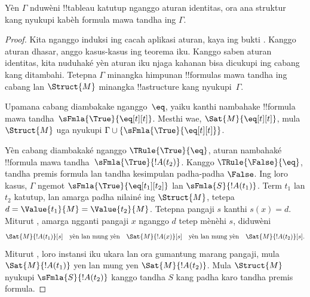 \documentclass[../../../include/open-logic-section]{subfiles}
\begin{document}


\begin{prop}
Yèn $\Gamma$ nduwèni !!{tableau} katutup nganggo aturan identitas,
ora ana struktur kang nyukupi kabèh formula mawa tandha ing $\Gamma$.
\end{prop}

\begin{proof}
Kita nganggo induksi ing cacah aplikasi aturan, kaya ing bukti
. Kanggo aturan dhasar, anggo kasus-kasus ing
teorema iku. Kanggo saben aturan identitas, kita nuduhaké yèn aturan
iku njaga kahanan bisa dicukupi ing cabang kang ditambahi.
Tetepna $\Gamma$ minangka himpunan !!{formula}s mawa tandha ing
cabang lan $\Struct{M}$ minangka !!a{structure} kang nyukupi~$\Gamma$.

Upamana cabang diambakake nganggo~$\eq$, yaiku kanthi nambahake
!!{formula} mawa tandha~$\sFmla{\True}{\eq[t][t]}$. Mesthi wae,
$\Sat{M}{\eq[t][t]}$, mula $\Struct{M}$ uga nyukupi $\Gamma \cup
\{\sFmla{\True}{\eq[t][t]}\}$.

Yèn cabang diambakaké nganggo $\TRule{\True}{\eq}$, aturan nambahaké
!!{formula} mawa tandha~$\sFmla{\True}{!A(t_2)}$. Kanggo
$\TRule{\False}{\eq}$, tandha premis formula lan tandha kesimpulan
padha-padha $\False$. Ing loro kasus, $\Gamma$ ngemot
$\sFmla{\True}{\eq[t_1][t_2]}$ lan $\sFmla{S}{!A(t_1)}$.
Term $t_1$ lan $t_2$ katutup, lan amarga padha nilainé ing
$\Struct{M}$, tetepa $d=\Value{t_1}{M}=\Value{t_2}{M}$.
Tetepna pangaji $s$ kanthi $s(x)=d$. Miturut
, amarga ngganti pangaji $x$ nganggo
$d$ tetep mènèhi $s$, diduwèni
\[
  \Sat{M}{!A(t_1)}[s] \quad\text{yèn lan mung yèn}\quad
  \Sat{M}{!A(x)}[s] \quad\text{yèn lan mung yèn}\quad \Sat{M}{!A(t_2)}[s].
\]
Miturut , loro instansi iku
ukara lan ora gumantung marang pangaji, mula
$\Sat{M}{!A(t_1)}$ yen lan mung yen $\Sat{M}{!A(t_2)}$.
Mula $\Struct{M}$ nyukupi $\sFmla{S}{!A(t_2)}$ kanggo tandha $S$
kang padha karo tandha premis formula.
\end{proof}
\end{document}
